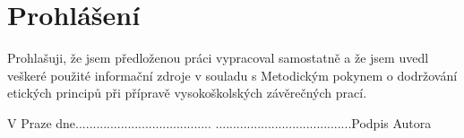 \chapter*{Prohlášení}
\label{declaration}



Prohlašuji, že jsem předloženou práci vypracoval samostatně a že jsem uvedl veškeré použité informační zdroje v souladu s Metodickým pokynem o dodržování etických principů při přípravě vysokoškolských závěrečných prací.

\vfill


\noindent V Praze dne....................................... \hfill .......................................Podpis Autora


